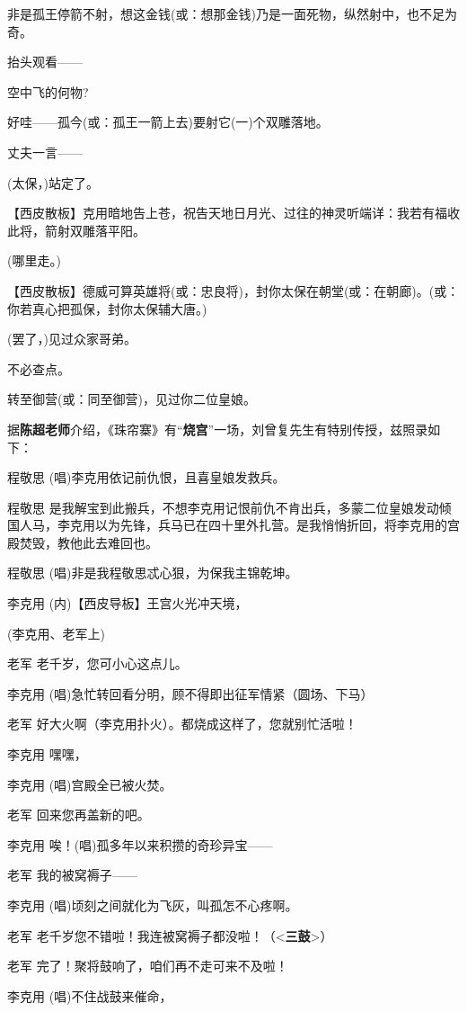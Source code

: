 非是孤王停箭不射，想这金钱(或：想那金钱)乃是一面死物，纵然射中，也不足为奇。

抬头观看------

空中飞的何物?

好哇------孤今(或：孤王一箭上去)要射它(一)个双雕落地。

丈夫一言------

(太保，)站定了。

【西皮散板】克用暗地告上苍，祝告天地日月光、过往的神灵听端详：我若有福收此将，箭射双雕落平阳。

(哪里走。)

【西皮散板】德威可算英雄将(或：忠良将)，封你太保在朝堂(或：在朝廊)。(或：你若真心把孤保，封你太保辅大唐。)

(罢了，)见过众家哥弟。

不必查点。

转至御营(或：同至御营)，见过你二位皇娘。

据\textbf{陈超老师}介绍，《珠帘寨》有``\textbf{烧宫}''一场，刘曾复先生有特别传授，兹照录如下：

程敬思 (唱)李克用依记前仇恨，且喜皇娘发救兵。

程敬思
是我解宝到此搬兵，不想李克用记恨前仇不肯出兵，多蒙二位皇娘发动倾国人马，李克用以为先锋，兵马已在四十里外扎营。是我悄悄折回，将李克用的宫殿焚毁，教他此去难回也。

程敬思 (唱)非是我程敬思忒心狠，为保我主锦乾坤。

李克用 (内)【西皮导板】王宫火光冲天境，

(李克用、老军上)

老军 老千岁，您可小心这点儿。

李克用 (唱)急忙转回看分明，顾不得即出征军情紧（圆场、下马）

老军 好大火啊（李克用扑火）。都烧成这样了，您就别忙活啦！

李克用 嘿嘿，

李克用 (唱)宫殿全已被火焚。

老军 回来您再盖新的吧。

李克用 唉！(唱)孤多年以来积攒的奇珍异宝------

老军 我的被窝褥子------

李克用 (唱)顷刻之间就化为飞灰，叫孤怎不心疼啊。

老军
老千岁您不错啦！我连被窝褥子都没啦！（\textless{}\textbf{三鼓}\textgreater{}）

老军 完了！聚将鼓响了，咱们再不走可来不及啦！

李克用 (唱)不住战鼓来催命，

